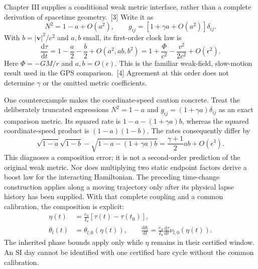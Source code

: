 \documentclass[10pt,twocolumn,letterpaper]{article}
\newcommand{\dd}{\mathrm{d}}
\begin{document}
Chapter III supplies a conditional weak metric interface, rather than a complete derivation of spacetime geometry.~[3] Write it as
\[
 N^2=1-a+O(a^2),\qquad
 g_{ij}=[1+\gamma a+O(a^2)]\delta_{ij}.
\]
With $b=|\bm v|^2/c^2$ and $a,b$ small, its first-order clock law is
\[
 \frac{\dd\tau}{\dd t}
 =1-\frac a 2-\frac b 2+O(a^2,ab,b^2)
 =1+\frac{\Phi}{c^2}-\frac{v^2}{2c^2}+O(\epsilon^2).
\]
Here $\Phi=-GM/r$ and $a,b=O(\epsilon)$. This is the familiar weak-field, slow-motion result used in the GPS comparison.~[4] Agreement at this order does not determine $\gamma$ or the omitted metric coefficients.

One counterexample makes the coordinate-speed caution concrete. Treat the deliberately truncated expressions $N^2=1-a$ and $g_{ij}=(1+\gamma a)\delta_{ij}$ as an exact comparison metric. Its squared rate is $1-a-(1+\gamma a)b$, whereas the squared coordinate-speed product is $(1-a)(1-b)$. The rates consequently differ by
\[
 \sqrt{1-a}\sqrt{1-b}
 -\sqrt{1-a-(1+\gamma a)b}
 =\frac{\gamma+1}{2}ab+O(\epsilon^3).
\]
This diagnoses a composition error; it is not a second-order prediction of the original weak metric. Nor does multiplying two static endpoint factors derive a boost law for the interacting Hamiltonian. The preceding time-change construction applies along a moving trajectory only after its physical lapse history has been supplied.
With that complete coupling and a common calibration, the composition is explicit:
\[
\begin{aligned}
 \eta(t)&=\frac{e_u}{I_u}[\tau(t)-\tau(t_0)],\\
 \theta_l(t)&=\theta_{l,0}(\eta(t)),\qquad
 \frac{\dd\theta_l}{\dd t}=\frac{e_u}{I_u}\frac{\dd\tau}{\dd t}\nu_{l,0}(\eta(t)).
\end{aligned}
\]
The inherited phase bounds apply only while $\eta$ remains in their certified window. An SI day cannot be identified with one certified bare cycle without the common calibration.
\end{document}
